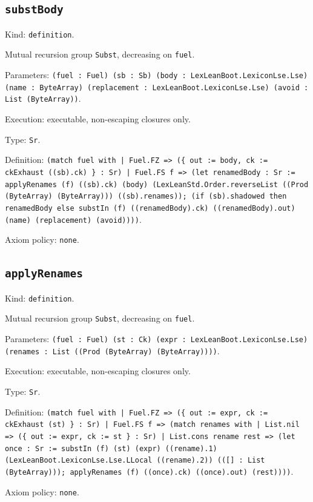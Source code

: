 \documentclass[11pt]{article}
\begin{document}
\subsection*{\texttt{substBody}}
\noindent Kind: \texttt{definition}.\par
\noindent Mutual recursion group \texttt{Subst}, decreasing on \texttt{fuel}.\par
\noindent Parameters: \texttt{(fuel : Fuel) (sb : Sb) (body : LexLeanBoot.LexiconLse.Lse) (name : ByteArray) (replacement : LexLeanBoot.LexiconLse.Lse) (avoid : List (ByteArray))}.\par
\noindent Execution: executable, non-escaping closures only.\par
\noindent Type: \texttt{Sr}.\par
\noindent Definition: \texttt{(match fuel with | Fuel.FZ => (\{ out := body, ck := ckExhaust ((sb).ck) \} : Sr) | Fuel.FS f => (let renamedBody : Sr := applyRenames (f) ((sb).ck) (body) (LexLeanStd.Order.reverseList ((Prod (ByteArray) (ByteArray))) ((sb).renames)); (if (sb).shadowed then renamedBody else substIn (f) ((renamedBody).ck) ((renamedBody).out) (name) (replacement) (avoid))))}.\par
\noindent Axiom policy: \texttt{none}.\par
\subsection*{\texttt{applyRenames}}
\noindent Kind: \texttt{definition}.\par
\noindent Mutual recursion group \texttt{Subst}, decreasing on \texttt{fuel}.\par
\noindent Parameters: \texttt{(fuel : Fuel) (st : Ck) (expr : LexLeanBoot.LexiconLse.Lse) (renames : List ((Prod (ByteArray) (ByteArray))))}.\par
\noindent Execution: executable, non-escaping closures only.\par
\noindent Type: \texttt{Sr}.\par
\noindent Definition: \texttt{(match fuel with | Fuel.FZ => (\{ out := expr, ck := ckExhaust (st) \} : Sr) | Fuel.FS f => (match renames with | List.nil => (\{ out := expr, ck := st \} : Sr) | List.cons rename rest => (let once : Sr := substIn (f) (st) (expr) ((rename).1) (LexLeanBoot.LexiconLse.Lse.LLocal ((rename).2)) (([] : List (ByteArray))); applyRenames (f) ((once).ck) ((once).out) (rest))))}.\par
\noindent Axiom policy: \texttt{none}.\par
\end{document}
